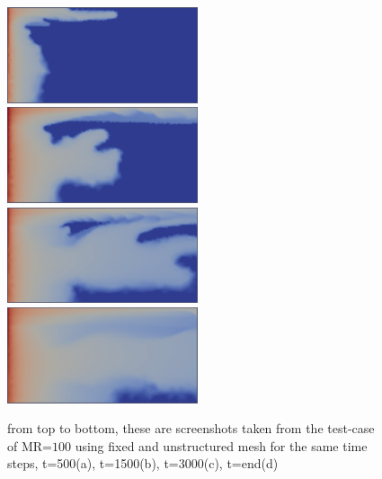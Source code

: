 \documentclass[preprint,authoryear,12pt]{elsarticle}
\begin{document}
{\begin{figure}
\begin{center}
\includegraphics[width=0.5\textwidth]{./Pics1/mr100_fixed/mr100_fixed_500.pdf}\\[2mm]%
\includegraphics[width=0.5\textwidth]{./Pics1/mr100_fixed/mr100_fixed_1500.pdf}\\[2mm]%
\includegraphics[width=0.5\textwidth]{./Pics1/mr100_fixed/mr100_fixed_3000.pdf}\\[2mm]%
\includegraphics[width=0.5\textwidth]{./Pics1/mr100_fixed/mr100_fixed_end.pdf}%
\caption{from top to bottom, these are screenshots taken from the test-case of MR=$100$ using fixed and unstructured mesh for the same time steps, t=500(a), t=1500(b), t=3000(c), t=end(d)}
\label{fig:4testcase}
\end{center}
\end{figure}

}
\end{document}
